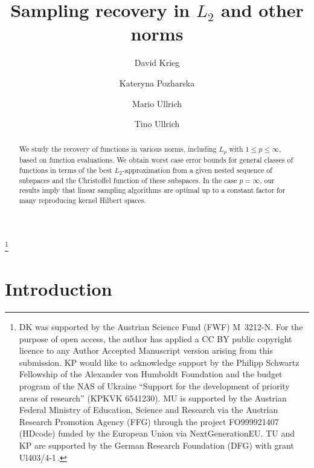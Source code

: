\documentclass[a4paper,12pt]{amsart}
\theoremstyle{definition}
\theoremstyle{remark}
\begin{document}
\title{Sampling recovery in $L_2$ and other norms}

\author{David Krieg}

\author{Kateryna Pozharska}

\author{Mario Ullrich}

 \author{Tino Ullrich}

\thanks{DK was supported by the Austrian Science Fund (FWF) M~3212-N. 
For the purpose of open access, the author has applied a CC BY public copyright licence to any Author Accepted Manuscript version arising from this submission. KP would like to acknowledge support by the Philipp Schwartz Fellowship of the Alexander von Humboldt Foundation and the budget program of the NAS of Ukraine ``Support for the development of priority areas of research'' (KPKVK 6541230). MU is supported by the Austrian Federal Ministry of Education, Science and Research via the Austrian Research Promotion Agency (FFG) through the project FO999921407 (HDcode) funded by the European Union via NextGenerationEU.
TU and KP are supported by the German Research Foundation (DFG) with grant Ul403/4-1\,.}






\date{}



\begin{abstract}
We study the recovery of functions in various %
norms, 
including $L_p$ with $1\le p\le\infty$, 
based on function evaluations. 
We obtain worst case error bounds for general classes of functions
in terms of the best $L_2$-approximation from a given nested sequence of subspaces 
and
the Christoffel function of these subspaces. 
In the case $p=\infty$, 
our results 
imply that linear sampling algorithms are optimal up to a constant factor
for many reproducing kernel Hilbert spaces.
\end{abstract}

\maketitle


\section{Introduction}
\end{document}
